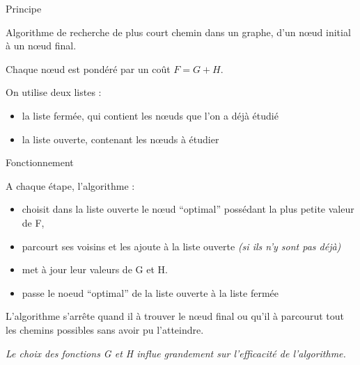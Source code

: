 
\begin{frame}


\begin{block}{Principe}

Algorithme de recherche de plus court chemin dans un graphe, d'un nœud initial à un nœud final.

\bigskip


Chaque nœud est pondéré par un coût $F = G + H$.


\bigskip

On utilise deux listes : 

\begin{itemize}
\item la liste fermée, qui contient les nœuds que l'on a déjà étudié

\item la liste ouverte, contenant les nœuds à étudier

\end{itemize}

\end{block}
\end{frame}

\begin{frame}

\begin{block}{Fonctionnement}

A chaque étape, l'algorithme : 
\begin{itemize}
\item choisit dans la liste ouverte le nœud ``optimal'' possédant la plus petite valeur de F,
\item parcourt ses voisins et les ajoute à la liste ouverte \textit{(si ils n'y sont pas déjà)} 
\item met à jour leur valeurs de G et H.
\item passe le noeud ``optimal'' de la liste ouverte à la liste fermée

\end{itemize}

L'algorithme s'arrête quand il à trouver le nœud final ou qu'il à parcourut tout les chemins possibles sans avoir pu l'atteindre.


\end{block} 

\bigskip


\textit{Le choix des fonctions G et H influe grandement sur l'efficacité de l'algorithme.}

\end{frame}
